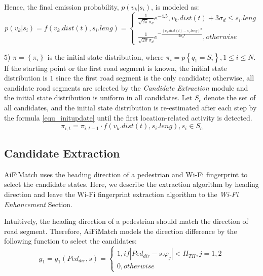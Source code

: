 \documentclass{llncs}
\begin{document}
Hence, the final emission probability, $p(v_k|s_i)$, is modeled as:
\begin{equation}
p(v_k|s_i)=f({v_k}.dist(t),{s_i}.leng) = \left\{ {\begin{array}{*{20}{l}}
	{\frac{1}{{\sqrt {2\pi } {\sigma _d}}}{e^{-4.5}},{v_k}.dist(t) + 3{\sigma _d} \le {s_i}.leng}\\
	{\frac{1}{{\sqrt {2\pi } {\sigma _d}}}{e^{ - \frac{{{{({v_k}.dist(t) - {s_i}.leng)}^2}}}{{2{\sigma _d}^2}}}},otherwise}
	\end{array}} \right.
\end{equation}

5) $\pi  = \left\{ {{\pi _i}} \right\}$ is the initial state distribution, where ${\pi _i} = p\left\{ {{q_1} = {S_i}} \right\},1 \le i \le N$. If the starting point or the first road segment is known, the initial state distribution is $1$ since the first road segment is the only candidate; otherwise, all candidate road segments are selected by the \emph{Candidate Extraction} module and the initial state distribution is uniform in all candidates. Let $S_c$ denote the set of all candidates, and the initial state distribution is re-estimated after each step by the formula \ref{equ_initupdate} until the first location-related activity is detected.
\begin{equation}
\label{equ_initupdate}
{\pi _{i,t}} = {\pi _{i,t - 1}} \cdot f({v_k}.dist(t),{s_i}.leng),{s_i} \in {S_c}
\end{equation}

\subsection{Candidate Extraction}

AiFiMatch uses the heading direction of a pedestrian and Wi-Fi fingerprint to select the candidate states. Here, we describe the extraction algorithm by heading direction and leave the Wi-Fi fingerprint extraction algorithm to the \emph{Wi-Fi Enhancement} Section.
	 
Intuitively, the heading direction of a pedestrian should match the direction of road segment. Therefore, AiFiMatch models the direction difference by the following function to select the candidates:
\begin{equation}
{g_1} = {g_1}({Ped_{dir}},s) = \left\{ {\begin{array}{*{20}{l}}
	{1,if\left| {{Ped_{dir}} - s.{{\varphi}_j}} \right| < H_{TH},j = 1,2}\\
	{0,otherwise}
	\end{array}} \right.
\end{equation}
\end{document}
